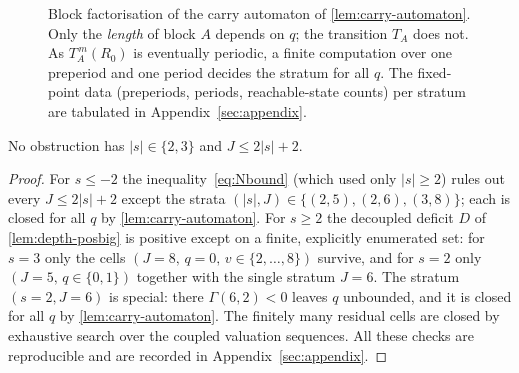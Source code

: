 \documentclass[11pt,reqno]{amsart}
\begin{document}
\begin{figure}[ht]
\centering
{}
\caption{Block factorisation of the carry automaton of
\cref{lem:carry-automaton}. Only the \emph{length} of block $A$ depends on $q$;
the transition $T_A$ does not. As $T_A^{\,m}(R_0)$ is eventually periodic, a
finite computation over one preperiod and one period decides the stratum for all
$q$. The fixed-point data (preperiods, periods, reachable-state counts) per
stratum are tabulated in Appendix~\ref{sec:appendix}.}
\label{fig:carry-blocks}
\end{figure}

\begin{lemma}\label{lem:finite-tails}
No obstruction has $|s| \in \{2,3\}$ and $J \le 2|s| + 2$.
\end{lemma}

\begin{proof}
For $s \le -2$ the inequality~\eqref{eq:Nbound} (which used only
$|s| \ge 2$) rules out every $J \le 2|s|+2$ except the strata
$(|s|, J) \in \{(2,5), (2,6), (3,8)\}$; each is closed for all $q$ by
\cref{lem:carry-automaton}. For $s \ge 2$ the decoupled deficit $D$ of
\cref{lem:depth-posbig} is positive except on a finite, explicitly enumerated
set: for $s = 3$ only the cells $(J=8,\, q=0,\, v \in \{2,\dots,8\})$ survive,
and for $s = 2$ only $(J=5,\, q \in \{0,1\})$ together with the single stratum
$J = 6$. The stratum $(s=2, J=6)$ is special: there $\Gamma(6,2) < 0$ leaves
$q$ unbounded, and it is closed for all $q$ by \cref{lem:carry-automaton}. The
finitely many residual cells are closed by exhaustive search over the coupled
valuation sequences. All
these checks are reproducible and are recorded in Appendix~\ref{sec:appendix}.
\qedhere
\end{proof}
\end{document}
